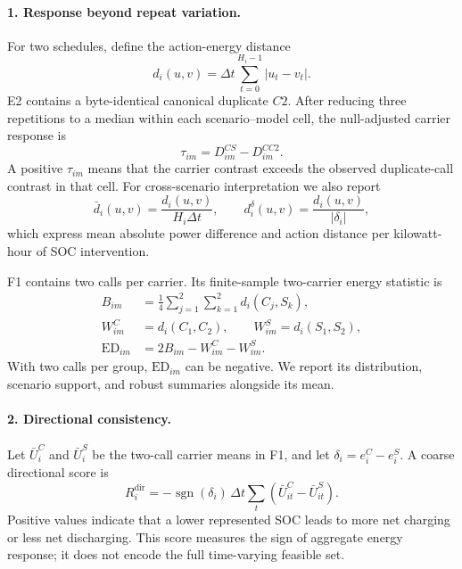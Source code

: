\documentclass[11pt]{article}
\begin{document}
\paragraph{1. Response beyond repeat variation.}
For two schedules, define the action-energy distance
\begin{equation}
 d_i(u,v)=\Delta t\sum_{t=0}^{H_i-1}|u_t-v_t|.
 \label{eq:distance}
\end{equation}
E2 contains a byte-identical canonical duplicate $C2$. After reducing three repetitions to a
median within each scenario--model cell, the null-adjusted carrier response is
\begin{equation}
 \tau_{im}=D^{CS}_{im}-D^{CC2}_{im}.
 \label{eq:null-adjusted}
\end{equation}
A positive $\tau_{im}$ means that the carrier contrast exceeds the observed duplicate-call
contrast in that cell. For cross-scenario interpretation we also report
\begin{equation}
 \bar d_i(u,v)=\frac{d_i(u,v)}{H_i\Delta t},
 \qquad
 d_i^{\delta}(u,v)=\frac{d_i(u,v)}{|\delta_i|},
 \label{eq:normalized-distance}
\end{equation}
which express mean absolute power difference and action distance per kilowatt-hour of SOC
intervention.

F1 contains two calls per carrier. Its finite-sample two-carrier energy statistic is
\begin{align}
 B_{im}&=\frac{1}{4}\sum_{j=1}^{2}\sum_{k=1}^{2}d_i(C_j,S_k),\\
 W^C_{im}&=d_i(C_1,C_2),\qquad W^S_{im}=d_i(S_1,S_2),\\
 \mathrm{ED}_{im}&=2B_{im}-W^C_{im}-W^S_{im}.
 \label{eq:ed}
\end{align}
With two calls per group, $\mathrm{ED}_{im}$ can be negative. We report its distribution,
scenario support, and robust summaries alongside its mean.

\paragraph{2. Directional consistency.}
Let $\bar U_i^C$ and $\bar U_i^S$ be the two-call carrier means in F1, and let
$\delta_i=e_i^C-e_i^S$. A coarse directional score is
\begin{equation}
 R_i^{\mathrm{dir}}=-\operatorname{sgn}(\delta_i)\,
 \Delta t\sum_t(\bar U_{it}^C-\bar U_{it}^S).
 \label{eq:direction}
\end{equation}
Positive values indicate that a lower represented SOC leads to more net charging or less net
discharging. This score measures the sign of aggregate energy response; it does not encode the
full time-varying feasible set.
\end{document}
